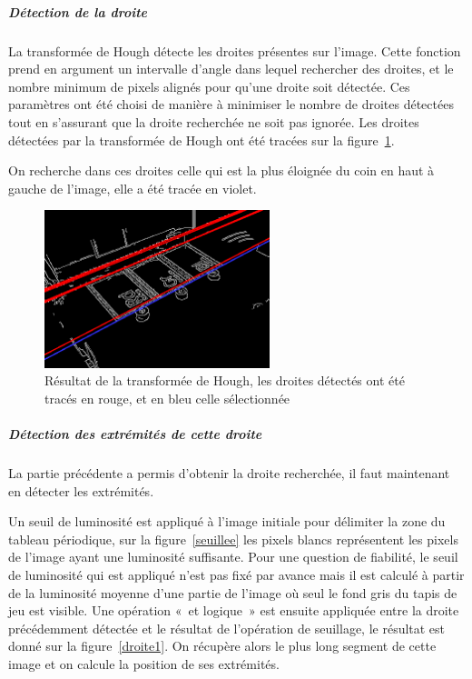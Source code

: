 \documentclass{report}
\begin{document}
\subparagraph{Détection de la droite}
La transformée de Hough détecte les droites présentes sur l’image. Cette fonction prend en argument un intervalle d’angle dans lequel rechercher des droites,
et le nombre minimum de pixels alignés pour qu’une droite soit détectée. Ces paramètres ont été choisi de manière à minimiser le nombre de droites détectées tout
en s’assurant que la droite recherchée ne soit pas ignorée. Les droites détectées par la transformée de Hough ont été tracées sur la figure~\ref{hough1}.

On recherche dans ces droites celle qui est la plus éloignée du coin en haut à gauche de l’image, elle a été tracée en violet.
\begin{figure}[!h]
\begin{center}
\includegraphics[height=130pt]{image_Canny_hough1.png}  
\end{center}
\caption{Résultat de la transformée de Hough, les droites détectés ont été tracés en rouge, et en bleu celle sélectionnée}
\label{hough1}
\end{figure}

\subparagraph{Détection des extrémités de cette droite}
La partie précédente a permis d’obtenir la droite recherchée, il faut maintenant en détecter les extrémités.

Un seuil de luminosité est appliqué à l’image initiale pour délimiter la zone du tableau périodique, sur la figure~\ref{seuillee} les pixels blancs
représentent les pixels de l’image ayant une luminosité suffisante. Pour une question de fiabilité, le seuil de luminosité qui est
appliqué n’est pas fixé par avance mais il est calculé à partir de la luminosité moyenne d’une partie de l’image où seul le fond gris
du tapis de jeu est visible.
Une opération « et logique » est ensuite appliquée entre la droite précédemment détectée et le résultat de l’opération de seuillage,
le résultat est donné sur la figure~\ref{droite1}. On récupère alors le plus long segment de cette image et on calcule la position de ses extrémités.
\end{document}
